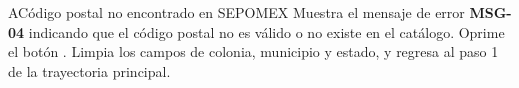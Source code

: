 \begin{UCtrayectoriaA}{A}{Código postal no encontrado en SEPOMEX}
	\UCpaso Muestra el mensaje de error \textbf{MSG-04} indicando que el código postal no es válido o no existe en el catálogo.
	\UCpaso[\UCactor] Oprime el botón .
	\UCpaso Limpia los campos de colonia, municipio y estado, y regresa al paso 1 de la trayectoria principal.
\end{UCtrayectoriaA}

